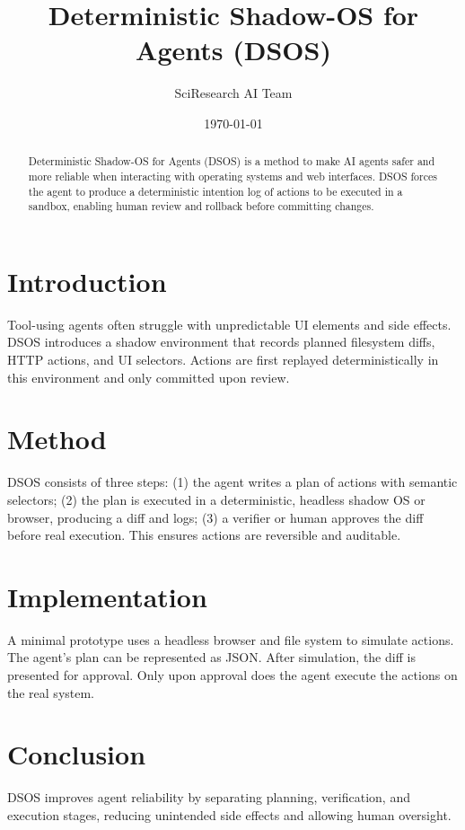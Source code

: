 \documentclass{article}
\title{Deterministic Shadow-OS for Agents (DSOS)}
\author{SciResearch AI Team}
\date{\today}
\begin{document}
\maketitle
\begin{abstract}
Deterministic Shadow-OS for Agents (DSOS) is a method to make AI agents safer and more reliable when interacting with operating systems and web interfaces. DSOS forces the agent to produce a deterministic intention log of actions to be executed in a sandbox, enabling human review and rollback before committing changes.
\end{abstract}
\section{Introduction}
Tool-using agents often struggle with unpredictable UI elements and side effects. DSOS introduces a shadow environment that records planned filesystem diffs, HTTP actions, and UI selectors. Actions are first replayed deterministically in this environment and only committed upon review.
\section{Method}
DSOS consists of three steps: (1) the agent writes a plan of actions with semantic selectors; (2) the plan is executed in a deterministic, headless shadow OS or browser, producing a diff and logs; (3) a verifier or human approves the diff before real execution. This ensures actions are reversible and auditable.
\section{Implementation}
A minimal prototype uses a headless browser and file system to simulate actions. The agent's plan can be represented as JSON. After simulation, the diff is presented for approval. Only upon approval does the agent execute the actions on the real system.
\section{Conclusion}
DSOS improves agent reliability by separating planning, verification, and execution stages, reducing unintended side effects and allowing human oversight.
\end{document}
